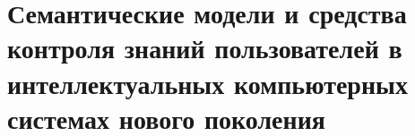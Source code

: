 \chapter{Семантические модели и средства контроля знаний пользователей в интеллектуальных компьютерных системах нового поколения}
\label{chapter_knowledge_control}


%